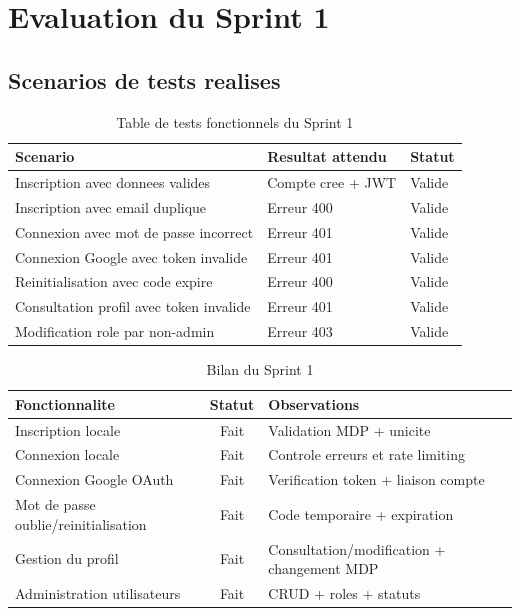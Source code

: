 \documentclass[a4paper,12pt]{report}
\begin{document}
\section{Evaluation du Sprint 1}

\subsection{Scenarios de tests realises}

\begin{table}[H]
  \centering
  \caption{Table de tests fonctionnels du Sprint 1}
  \label{tab:tests_s1}
  \begin{tabular}{|p{5.2cm}|p{3.2cm}|p{5.4cm}|}
    \hline
    \textbf{Scenario} & \textbf{Resultat attendu} & \textbf{Statut} \\
    \hline
    Inscription avec donnees valides & Compte cree + JWT & Valide \\
    \hline
    Inscription avec email duplique & Erreur 400 & Valide \\
    \hline
    Connexion avec mot de passe incorrect & Erreur 401 & Valide \\
    \hline
    Connexion Google avec token invalide & Erreur 401 & Valide \\
    \hline
    Reinitialisation avec code expire & Erreur 400 & Valide \\
    \hline
    Consultation profil avec token invalide & Erreur 401 & Valide \\
    \hline
    Modification role par non-admin & Erreur 403 & Valide \\
    \hline
  \end{tabular}
\end{table}

\begin{table}[H]
  \centering
  \caption{Bilan du Sprint 1}
  \label{tab:bilan_s1}
  \begin{tabular}{|p{5cm}|c|p{6.5cm}|}
    \hline
    \textbf{Fonctionnalite} & \textbf{Statut} & \textbf{Observations} \\
    \hline
    Inscription locale & Fait & Validation MDP + unicite \\
    \hline
    Connexion locale & Fait & Controle erreurs et rate limiting \\
    \hline
    Connexion Google OAuth & Fait & Verification token + liaison compte \\
    \hline
    Mot de passe oublie/reinitialisation & Fait & Code temporaire + expiration \\
    \hline
    Gestion du profil & Fait & Consultation/modification + changement MDP \\
    \hline
    Administration utilisateurs & Fait & CRUD + roles + statuts \\
    \hline
  \end{tabular}
\end{table}
\end{document}
